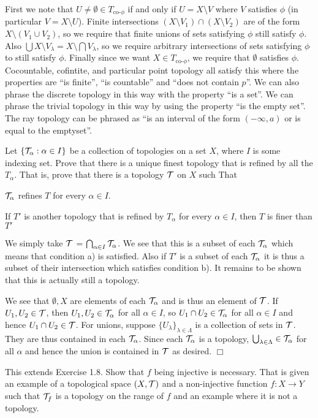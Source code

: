 \documentclass{article}
\begin{document}
\begin{spacedenumerate}
    First we note that $U\neq\emptyset\in T_{\text{co-}\phi}$ if and only if $U = X\setminus V$ where $V$ satisfies $\phi$ (in particular $V = X\setminus U$). Finite intersections $(X\setminus V_{1})\cap (X\setminus V_{2})$ are of the form $X\setminus (V_{1}\cup V_{2})$, so we require that finite unions of sets satisfying $\phi$ still satisfy $\phi$. Also $\bigcup X\setminus V_{\lambda} = X\setminus \bigcap V_{\lambda}$, so we require arbitrary intersections of sets satisfying $\phi$ to still satisfy $\phi$. Finally since we want $X\in T_{\text{co-}\phi} $, we require that $\emptyset$ satisfies $\phi$. Cocountable, cofintite, and particular point topology all satisfy this where the properties are ``is finite'', ``is countable'' and ``does not contain $p$''. We can also phrase the discrete topology in this way with the property ``is a set''. We can phrase the trivial topology in this way by using the property ``is the empty set''. The ray topology can be phrased as ``is an interval of the form $(-\infty, a)$ or is equal to the emptyset''.

    \item Let $\{\mathcal{T}_{\alpha}:\alpha\in I\}$ be a collection of topologies on a set $X$, where $I$ is some indexing set. Prove that there is a unique finest topology that is refined by all the $T_{\alpha}$. That is, prove that there is a topology $\mathcal{T}$ on $X$ such That
    \begin{spacedenumerate}
        \item $\mathcal{T}_{\alpha}$ refines $T$ for every $\alpha \in I$.
        \item If $T'$ is another topology that is refined by $T_{\alpha}$ for every $\alpha\in I$, then $T$ is finer than $T'$
    \end{spacedenumerate}
    We simply take $\mathcal{T}$ = $\bigcap_{\alpha\in I} \mathcal{T}_{\alpha}$. We see that this is a subset of each $\mathcal{T}_{\alpha}$ which means that condition a) is satisfied. Also if $T'$ is a subset of each $\mathcal{T}_{\alpha}$ it is thus a subset of their intersection which satisfies condition b). It remains to be shown that this is actually still a topology.

    We see that $\emptyset, X$ are elements of each $\mathcal{T}_{\alpha}$ and is thus an element of $\mathcal{T}$. If $U_{1},U_{2}\in \mathcal{T}$, then $U_{1},U_{2}\in \mathcal{T}_{\alpha}$ for all $\alpha\in I$, so $U_{1}\cap U_{2}\in \mathcal{T}_{\alpha}$ for all $\alpha\in I$ and hence $U_{1}\cap U_{2}\in \mathcal{T}$. For unions, suppose $\{U_{\lambda}\}_{\lambda\in \Lambda}$ is a collection of sets in $\mathcal{T}$. They are thus contained in each $\mathcal{T}_{\alpha}$. Since each $\mathcal{T}_{\alpha}$ is a topology, $\bigcup_{\lambda\in\Lambda}\in \mathcal{T}_{\alpha}$ for all $\alpha$ and hence the union is contained in $\mathcal{T}$ as desired. $\Box$
    \item This extends Exercise 1.8. Show that $f$ being injective is necessary. That is given an example of a topological space $(X,\mathcal{T})$ and a non-injective function $f:X\to Y$ such that $\mathcal{T}_{f}$ is a topology on the range of $f$ and an example where it is not a topology.
    

\end{spacedenumerate}
\end{document}
